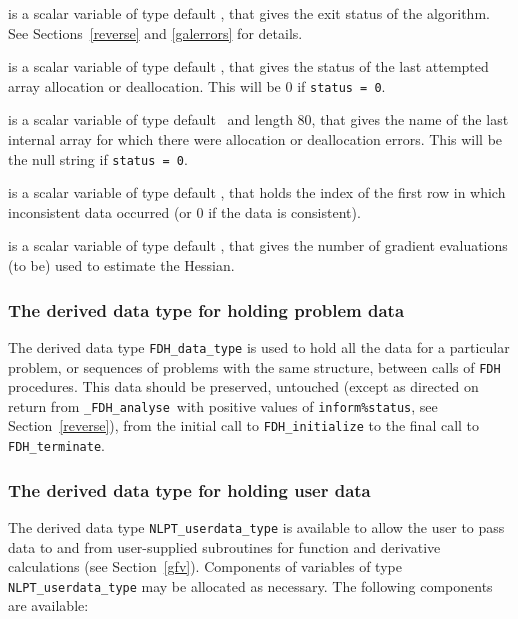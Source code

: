 \documentclass{galahad}
\newcommand{\packagename}{FDH}
\newcommand{\fullpackagename}{\libraryname\_\packagename}
\newcommand{\solver}{{\tt \fullpackagename\_analyse}}
\begin{document}
\begin{description}
 is a scalar variable of type default \integer, that gives the
exit status of the algorithm. 
See Sections~\ref{reverse} and \ref{galerrors}
for details.

 is a scalar variable of type default \integer, that gives
the status of the last attempted array allocation or deallocation.
This will be 0 if {\tt status = 0}.

 is a scalar variable of type default \character\
and length 80, that  gives the name of the last internal array 
for which there were allocation or deallocation errors.
This will be the null string if {\tt status = 0}. 

 is a scalar variable of type default \integer, that holds the 
index of the first row in which inconsistent data occurred (or 0 if the data is 
consistent).

 is a scalar variable of type default \integer, that gives the
number of gradient evaluations (to be) used to estimate the Hessian.

\end{description}


\subsubsection{The derived data type for holding problem data}\label{typedata}
The derived data type 
{\tt \packagename\_data\_type} 
is used to hold all the data for a particular problem,
or sequences of problems with the same structure, between calls of 
{\tt \packagename} procedures. 
This data should be preserved, untouched (except as directed on
return from \solver\ with positive values of {\tt inform\%status}, see
Section~\ref{reverse}),
from the initial call to 
{\tt \packagename\_initialize}
to the final call to
{\tt \packagename\_terminate}.


\subsubsection{The derived data type for holding user data}\label{typeuserdata}
The derived data type 
{\tt NLPT\_userdata\_type} 
is available to allow the user to pass data to and from user-supplied 
subroutines for function and derivative calculations (see Section~\ref{gfv}).
Components of variables of type {\tt NLPT\_userdata\_\-type} may be allocated as
necessary. The following components are available:
\end{document}
